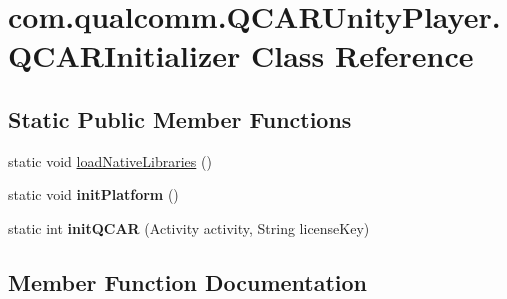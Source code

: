 \hypertarget{classcom_1_1qualcomm_1_1_q_c_a_r_unity_player_1_1_q_c_a_r_initializer}{}\section{com.\+qualcomm.\+Q\+C\+A\+R\+Unity\+Player.\+Q\+C\+A\+R\+Initializer Class Reference}
\label{classcom_1_1qualcomm_1_1_q_c_a_r_unity_player_1_1_q_c_a_r_initializer}
\subsection*{Static Public Member Functions}
\begin{DoxyCompactItemize}
\item 
static void \hyperlink{classcom_1_1qualcomm_1_1_q_c_a_r_unity_player_1_1_q_c_a_r_initializer_a4753bc9ae45eadc7e7af8a3485a2aab6_a4753bc9ae45eadc7e7af8a3485a2aab6}{load\+Native\+Libraries} ()
\item 
\hypertarget{classcom_1_1qualcomm_1_1_q_c_a_r_unity_player_1_1_q_c_a_r_initializer_adbd8f313101fe4d2216d7d8c344fea88}{}static void {\bfseries init\+Platform} ()\label{classcom_1_1qualcomm_1_1_q_c_a_r_unity_player_1_1_q_c_a_r_initializer_adbd8f313101fe4d2216d7d8c344fea88}

\item 
\hypertarget{classcom_1_1qualcomm_1_1_q_c_a_r_unity_player_1_1_q_c_a_r_initializer_a6ba6e9aa440b539e18dcc5316ea6bb79}{}static int {\bfseries init\+Q\+C\+A\+R} (Activity activity, String license\+Key)\label{classcom_1_1qualcomm_1_1_q_c_a_r_unity_player_1_1_q_c_a_r_initializer_a6ba6e9aa440b539e18dcc5316ea6bb79}

\end{DoxyCompactItemize}


\subsection{Member Function Documentation}
\hypertarget{classcom_1_1qualcomm_1_1_q_c_a_r_unity_player_1_1_q_c_a_r_initializer_a4753bc9ae45eadc7e7af8a3485a2aab6_a4753bc9ae45eadc7e7af8a3485a2aab6}{}
